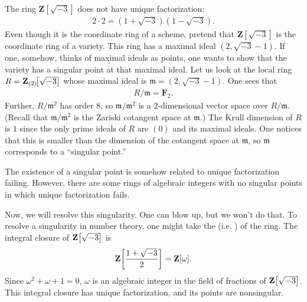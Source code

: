 \documentclass [11 pt, oneside] {article}
\begin{document}
\begin{example}[ ]\label{}\text{}
The ring $\mathbf{Z}\!\left[\sqrt{-3}\right]$ does not have unique factorization:
\begin{align*}
	2\cdot 2 = (1+\sqrt{-3} ) (1-\sqrt{-3} ).
\end{align*}
Even though it is the coordinate ring of a scheme, pretend that $\mathbf{Z}\!\left[\sqrt{-3}\right]$ is the coordinate ring of a variety. This ring has a maximal ideal $(2,\sqrt{-3}-1 )$. If one, somehow, thinks of maximal ideals as points, one wants to show that the variety has a singular point at that maximal ideal. Let us look at the local ring $R=\mathbf Z_{(2)} \!\!\left[ \sqrt{-3}  \right] $ whose maximal ideal is $\mathfrak{m}=(2,\sqrt{-3}-1 )$. One sees that \begin{align*}
	R/\mathfrak{m} = \mathbf{F}_{2}.
\end{align*}
Further, $R/\mathfrak{m}^2$ has order $8$, so $\mathfrak{m}/\mathfrak{m}^2$ is a $2$-dimensional vector space over $R/\mathfrak{m}$. (Recall that $\mathfrak{m}/\mathfrak{m}^2$ is the Zariski cotangent space at $\mathfrak{m}$.) The Krull dimension of $R$ is $1$ since the only prime ideals of $R$ are $(0)$ and its maximal ideals. One notices that this is smaller than the dimension of the cotangent space at $\mathfrak{m}$, so $\mathfrak{m}$ corresponds to a ``singular point.''

\begin{remark}
	The existence of a singular point is somehow related to unique factorization failing. However, there are some rings of algebraic integers with no singular points in which unique factorization fails. 
\end{remark}

Now, we will resolve this singularity. One can blow up, but we won't do that. To resolve a singularity in number theory, one might take the  (i.e. ) of the ring. The integral closure of $\mathbf Z\!\left[ \sqrt{-3}  \right] $ is
\begin{align*}
	\mathbf Z \!\left[ \frac{1+\sqrt{-3} }{2} \right] = \mathbf Z[\omega] .
\end{align*}
Since $\omega^2+\omega+1=0$, $\omega$ is an algebraic integer in the field of fractions of $\mathbf Z\!\left[ \sqrt{-3}  \right] $. This integral closure has unique factorization, and its points are nonsingular.
\end{example}
\end{document}
